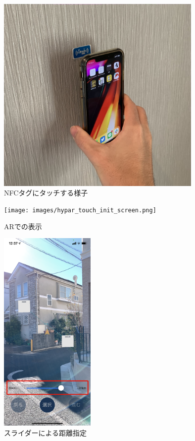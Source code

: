 \begin{figure}[H]
  \centering
  \includegraphics[width=100mm]{images/touch_nfc.jpg}
  \caption{NFCタグにタッチする様子} \label{fig:touch_nfc}
\end{figure}

\begin{figure}[H]
  \begin{minipage}{0.5\hsize}
    \centering
    \texttt{[image: images/hypar\_touch\_init\_screen.png]}
    \caption{ARでの表示} \label{fig:hypar_touch_init_screen}
  \end{minipage}
  \begin{minipage}{0.5\hsize}
    \centering
    \includegraphics[height=100mm]{images/hypar_touch_slider.png}
    \caption{スライダーによる距離指定} \label{fig:hypar_touch_slider}
  \end{minipage}
\end{figure}

